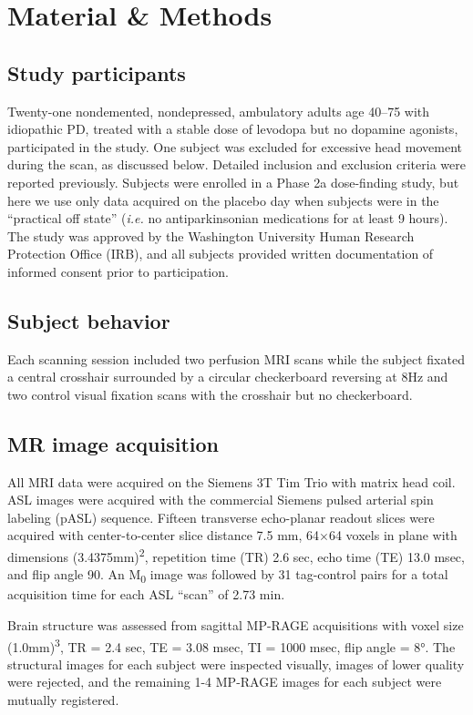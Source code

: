 \section{Material \& Methods}

\subsection{Study participants}
Twenty-one nondemented, nondepressed, ambulatory adults age 40–75 with idiopathic PD, treated with a stable dose of levodopa but no dopamine agonists, participated in the study. One subject was excluded for excessive head movement during the scan, as discussed below. Detailed inclusion and exclusion criteria were reported previously.\cite{SYN115_2010_AAN_RCT} Subjects were enrolled in a Phase 2a dose-finding study,\cite{Black_2010} but here we use only data acquired on the placebo day when subjects were in the ``practical off state'' (\textit{i.e.} no antiparkinsonian medications for at least 9 hours). The study was approved by the Washington University Human Research Protection Office (IRB), and all subjects provided written documentation of informed consent prior to participation.

\subsection{Subject behavior}
Each scanning session included two perfusion MRI scans while the subject fixated a central crosshair surrounded by a circular checkerboard reversing at 8Hz and two control visual fixation scans with the crosshair but no checkerboard. 

\subsection{MR image acquisition}
All MRI data were acquired on the Siemens 3T Tim Trio with matrix head coil. ASL images were acquired with the commercial Siemens pulsed arterial spin labeling (pASL) sequence.\cite{Wang_2003} Fifteen transverse echo-planar readout slices were acquired with center-to-center slice distance 7.5 mm, 64$\times$64 voxels in plane with dimensions (3.4375mm)\textsuperscript{2}, repetition time (TR) 2.6 sec, echo time (TE) 13.0 msec, and flip angle 90\textdegree. An M\textsubscript{0} image was followed by 31 tag-control pairs for a total acquisition time for each ASL ``scan'' of 2.73 min.

Brain structure was assessed from sagittal MP-RAGE acquisitions with voxel size (1.0mm)\textsuperscript{3}, TR = 2.4 sec, TE = 3.08 msec, TI = 1000 msec, flip angle = 8°. The structural images for each subject were inspected visually, images of lower quality were rejected, and the remaining 1-4 MP-RAGE images for each subject were mutually registered.

